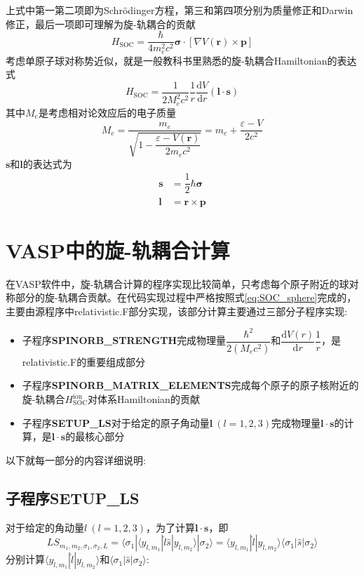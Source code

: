 \documentclass[10pt, oneside, a4paper]{article}      %
\begin{document}
上式中第一第二项即为\textrm{Schr\"odinger}方程，第三和第四项分别为质量修正和\textrm{Darwin}修正，最后一项即可理解为旋-轨耦合的贡献
\begin{equation}
	H_{\mathrm{SOC}}=\dfrac{\hbar}{4m_e^2c^2}{\bm\sigma}\cdot[\nabla V(\mathbf{r})\times\mathbf{p}]
	\label{eq:SOC_Hamilton}
\end{equation}
考虑单原子球对称势近似，就是一般教科书里熟悉的旋-轨耦合\textrm{Hamiltonian}的表达式
\begin{equation}
	H_{\mathrm{SOC}}=\dfrac1{2M_e^2c^2}\dfrac1r\dfrac{\mathrm{d}V}{\mathrm{d}r}(\mathbf{l}\cdot\mathbf{s})
	\label{eq:SOC_sphere}
\end{equation}
其中$M_e$是考虑相对论效应后的电子质量
\begin{displaymath}
	M_e = \dfrac{m_e}{\sqrt{1-\dfrac{\varepsilon-V(\mathbf{r})}{2m_ec^2}}}=m_e+\dfrac{\varepsilon-V}{2c^2}
\end{displaymath}
$\mathbf{s}$和$\mathbf{l}$的表达式为
\begin{displaymath}
	\begin{aligned}
		\mathbf{s}&=\dfrac12\hbar\bm\sigma\\
		\mathbf{l}&=\mathbf{r}\times\mathbf{p}
	\end{aligned}
\end{displaymath}

\section{\rm{VASP}中的旋-轨耦合计算}
在\textrm{VASP}软件中，旋-轨耦合计算的程序实现比较简单，只考虑每个原子附近的球对称部分的旋-轨耦合贡献。在代码实现过程中严格按照式\eqref{eq:SOC_sphere}完成的，主要由源程序中\textrm{relativistic.F}部分实现，该部分计算主要通过三部分子程序实现:
\begin{itemize}
	\item 子程序\textbf{SPINORB\_STRENGTH}完成物理量$\dfrac{\hbar^2}{2(M_ec^2)}$和$\dfrac{\mathrm{d}V(r)}{\mathrm{d}r}\dfrac1r$，是\textrm{relativistic.F}的重要组成部分
	\item 子程序\textbf{SPINORB\_MATRIX\_ELEMENTS}完成每个原子的原子核附近的旋-轨耦合$H_{\mathrm{SOC}}^{\mathrm{ion}}$对体系\textrm{Hamiltonian}的贡献
	\item 子程序\textbf{SETUP\_LS}对于给定的原子角动量$\mathbf{l}~(l=1,2,3)$完成物理量$\mathbf{l}\cdot\mathbf{s}$的计算，是$\mathbf{l}\cdot\mathbf{s}$的最核心部分
\end{itemize}
以下就每一部分的内容详细说明:
\subsection{子程序\bf{SETUP\_LS}}
对于给定的角动量$l~(l=1,2,3)$，为了计算$\mathbf{l}\cdot\mathbf{s}$，即
\begin{displaymath}
	LS_{m_1,m_2,\sigma_1,\sigma_2,L}=\langle\sigma_1|\langle y_{l,m_1}|\hat l\hat s|y_{l,m_2}\rangle|\sigma_2\rangle=\langle y_{l,m_1}|\hat l|y_{l,m_2}\rangle\langle\sigma_1|\hat s|\sigma_2\rangle
\end{displaymath}
分别计算$\langle y_{l,m_1}|\hat l|y_{l,m_2}\rangle$和$\langle\sigma_1|\hat s|\sigma_2\rangle$:
\end{document}
